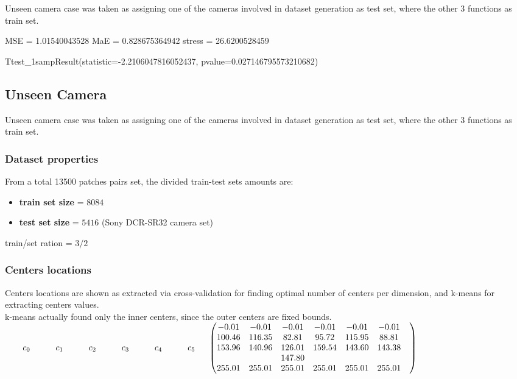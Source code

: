 Unseen camera case was taken as assigning one of the cameras involved in dataset generation as test set, where the other 3 functions as train set.

MSE =  1.01540043528
MaE =  0.828675364942
stress =  26.6200528459

Ttest_1sampResult(statistic=-2.2106047816052437, pvalue=0.027146795573210682)
	

\subsection{Unseen Camera}

Unseen camera case was taken as assigning one of the cameras involved in dataset generation as test set, where the other 3 functions as train set.


	\subsubsection{Dataset properties}
	
		From a total 13500 patches pairs set, the divided train-test sets amounts are:
		\begin{itemize}
			\item \textbf{train set size} = $8084$ 
			\item \textbf{test set size} = $5416$ (Sony DCR-SR32 camera set)
		\end{itemize}
		
		train/set ration = $3/2$

	\subsubsection{Centers locations}
	
	Centers locations are shown as extracted via cross-validation for finding optimal number of centers per dimension, and k-means for extracting centers values. \\
	k-means actually found only the inner centers, since the outer centers are fixed bounds.\\


	$
	\begin{matrix}  \qquad  c_0 \quad  \qquad c_1 \quad  \qquad c_2 \qquad \quad  c_3 \qquad \quad c_4 \qquad \quad c_5 \quad \end{matrix}\\
			
	
	\begin{pmatrix}
			     -0.01 &     -0.01 &    -0.01 & -0.01   & -0.01   & -0.01    \\
				100.46 &   116.35 &    82.81 &    95.72 & 115.95 & 88.81     \\
				153.96 &   140.96 &   126.01 &   159.54 & 143.60 & 143.38    \\
				       &          &   147.80 &          &        &             \\
	     		 255.01 &  255.01 &   255.01 &   255.01 &  255.01 &  255.01 & \\
			\end{pmatrix}
	$ 
\\
	

